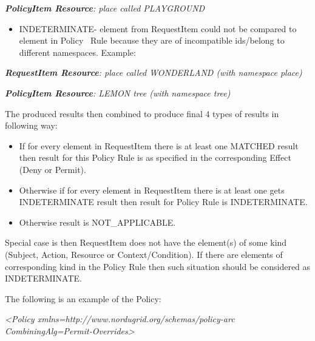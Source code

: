 \documentclass{article}
\newcommand\liststyleWWviiiNumxx{%
\renewcommand\theenumi{\arabic{enumi}}
\renewcommand\theenumii{\arabic{enumii}}
\renewcommand\theenumiii{\arabic{enumiii}}
\renewcommand\labelitemi{o}
\renewcommand\labelenumi{\theenumi.}
\renewcommand\labelenumii{\theenumii.}
\renewcommand\labelenumiii{\theenumiii.}
}
\begin{document}
{\upshape\color{black}
\foreignlanguage{english}{\textbf{\textit{PolicyItem
Resource}}}\foreignlanguage{english}{\textit{: place called
PLAYGROUND}}}

\liststyleWWviiiNumxx
\begin{itemize}
\item {\color{black}
INDETERMINATE- element from RequestItem could not be compared to element
in Policy \ Rule because they are of incompatible ids/belong to
different namespaces. Example:}
\end{itemize}
{\upshape\color{black}
\foreignlanguage{english}{\textbf{\textit{RequestItem
Resource}}}\foreignlanguage{english}{\textit{: place called WONDERLAND
(with namespace {\textquotedbl}place{\textquotedbl})}}}

{\upshape\color{black}
\foreignlanguage{english}{\textbf{\textit{PolicyItem
Resource}}}\foreignlanguage{english}{\textit{: LEMON tree (with
namespace {\textquotedbl}tree{\textquotedbl})}}}

{\color{black}
The produced results then combined to produce final 4 types of results
in following way:}

\liststyleWWviiiNumxx
\begin{itemize}
\item {\color{black}
If for every element in RequestItem there is at least one MATCHED result
then result for this Policy Rule is as specified in the corresponding
Effect (Deny or Permit).}
\item {\color{black}
Otherwise if for every element in RequestItem there is at least one gets
INDETERMINATE result then result for Policy Rule is INDETERMINATE.}
\item {\color{black}
Otherwise result is NOT\_APPLICABLE.}
\end{itemize}
{\color{black}
Special case is then RequestItem does not have the element(s) of some
kind (Subject, Action, Resource or Context/Condition). If there are
elements of corresponding kind in the Policy Rule then such situation
should be considered as INDETERMINATE.}

{\color{black}
The following is an example of the Policy:}

{\itshape\color{black}
{\textless}Policy
xmlns={\textquotedbl}http://www.nordugrid.org/schemas/policy-arc{\textquotedbl}
CombiningAlg={\textquotedbl}Permit-Overrides{\textquotedbl}{\textgreater}}
\end{document}
